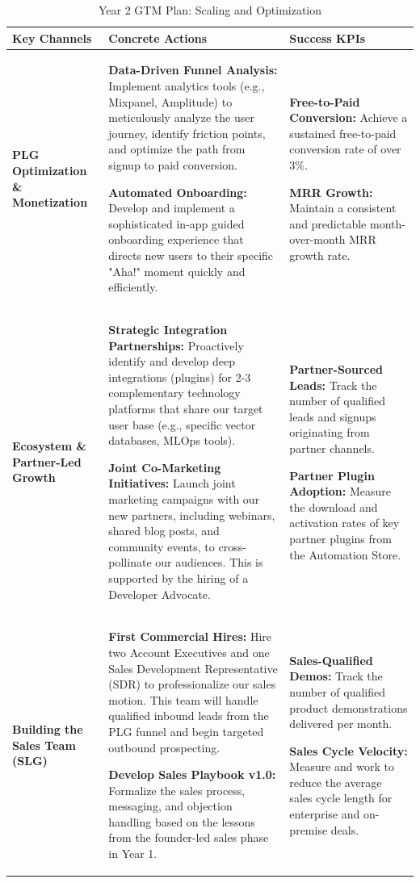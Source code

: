 \documentclass[11pt, a4paper, oneside]{article}
\begin{document}
\begin{table}[!htbp]
\centering
\caption{Year 2 GTM Plan: Scaling and Optimization}
\label{tab:gtm_year2}
\begin{tabular}{p{} p{} p{}}
\toprule
\textbf{Key Channels} & \textbf{Concrete Actions} & \textbf{Success KPIs} \\
\midrule
\textbf{PLG Optimization \& Monetization} &
\textbf{Data-Driven Funnel Analysis:} Implement analytics tools (e.g., Mixpanel, Amplitude) to meticulously analyze the user journey, identify friction points, and optimize the path from signup to paid conversion.

\textbf{Automated Onboarding:} Develop and implement a sophisticated in-app guided onboarding experience that directs new users to their specific "Aha!" moment quickly and efficiently.
&
\textbf{Free-to-Paid Conversion:} Achieve a sustained free-to-paid conversion rate of over 3\%.

\textbf{MRR Growth:} Maintain a consistent and predictable month-over-month MRR growth rate.
\\
\addlinespace
\textbf{Ecosystem \& Partner-Led Growth} &
\textbf{Strategic Integration Partnerships:} Proactively identify and develop deep integrations (plugins) for 2-3 complementary technology platforms that share our target user base (e.g., specific vector databases, MLOps tools).

\textbf{Joint Co-Marketing Initiatives:} Launch joint marketing campaigns with our new partners, including webinars, shared blog posts, and community events, to cross-pollinate our audiences. This is supported by the hiring of a Developer Advocate.
&
\textbf{Partner-Sourced Leads:} Track the number of qualified leads and signups originating from partner channels.

\textbf{Partner Plugin Adoption:} Measure the download and activation rates of key partner plugins from the Automation Store.
\\
\addlinespace
\textbf{Building the Sales Team (SLG)} &
\textbf{First Commercial Hires:} Hire two Account Executives and one Sales Development Representative (SDR) to professionalize our sales motion. This team will handle qualified inbound leads from the PLG funnel and begin targeted outbound prospecting.

\textbf{Develop Sales Playbook v1.0:} Formalize the sales process, messaging, and objection handling based on the lessons from the founder-led sales phase in Year 1.
&
\textbf{Sales-Qualified Demos:} Track the number of qualified product demonstrations delivered per month.

\textbf{Sales Cycle Velocity:} Measure and work to reduce the average sales cycle length for enterprise and on-premise deals.
\\
\bottomrule
\end{tabular}
\end{table}
\end{document}
